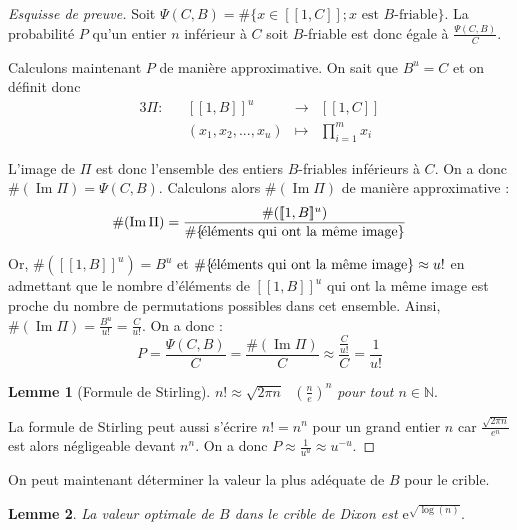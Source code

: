 \documentclass[french, 12pt, titlepage]{article}
\DeclareMathOperator{\Ima}{Im}
\newcommand{\N}{\mathbb{N}}
\newtheorem{lemme}{Lemme}
\begin{document}
\begin{proof}[Esquisse de preuve]

Soit $\Psi(C, B) = \#\{x \in [\![1, C]\!]; x \text{ est } B\text{-friable}\}.$
La probabilité $P$ qu'un entier $n$ inférieur à $C$ soit $B$-friable est donc égale à $\frac{\Psi(C, B)}{C}.$

Calculons maintenant $P$ de manière approximative. On sait que $B^u =
C$ et on définit donc 
\begin{alignat*}{3}
\Pi : && [\![1, B]\!]^u & \to & [\![1, C]\!] \\
&& (x_1, x_2, ..., x_u) & \mapsto & \prod\limits_{i = 1}^m x_i
\end{alignat*}

L'image de $\Pi$ est donc l'ensemble des entiers $B$-friables inférieurs à $C.$ On a donc $\#(\Ima \Pi) = \Psi(C, B).$ Calculons alors $\#(\Ima \Pi)$ de manière approximative :
\[\#(\Ima \Pi) = \frac{\#([\![1, B]\!]^u)}{\#\{\text{\!éléments qui ont la même image}\}}\]

Or, $\#([\![1, B]\!]^u) = B^u$ et
$\#\{\text{\!éléments qui ont la même image}\} \approx u!$ en admettant que le nombre d'éléments de $[\![1, B]\!]^u$ qui ont la même image est proche du nombre de permutations possibles dans cet ensemble.
Ainsi, $\#(\Ima \Pi) = \frac{B^u}{u!} = \frac{C}{u!}.$ On a donc :
\[P = \frac{\Psi(C, B)}{C} = \frac{\#(\Ima \Pi)}{C} \approx \frac{\frac{C}{u!}}{C} = \frac{1}{u!}\]

\begin{lemme}[Formule de Stirling]
$n! \approx \sqrt{2\pi n}\text{ }(\frac{n}{e})^n$ pour tout $n \in \N.$
\end{lemme}

La formule de Stirling peut aussi s'écrire $n! = n^n$ pour un grand entier $n$ car $\frac{\sqrt{2\pi n}}{e^n}$ est alors négligeable devant $n^n.$
On a donc $P \approx \frac{1}{u^u} \approx u^{-u}.$ 
\end{proof}

On peut maintenant déterminer la valeur la plus adéquate de $B$ pour le crible.

\begin{lemme}
La valeur optimale de $B$ dans le crible de Dixon est $\text{e}^{\sqrt{\log(n)}}.$
\end{lemme}
\end{document}
